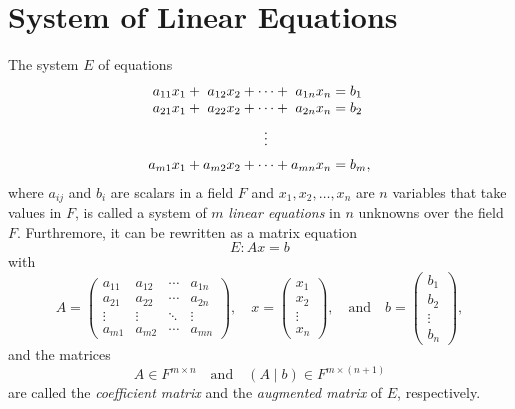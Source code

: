 \section{System of Linear Equations}
\begin{definition}
  \label{def:system-linear-equations}
  The system $E$ of equations
  \begin{equation*}
    \setlength\arraycolsep{0pt}
    \begin{array}{rcrcccrcl}
      a_{11}x_1 &\pl& a_{12}x_2 &\pl& \cdots &\pl& a_{1n}x_n &\eq& b_1 \\
      a_{21}x_1 &\pl& a_{22}x_2 &\pl& \cdots &\pl& a_{2n}x_n &\eq& b_2 \\[.5em]
                &   &           &   & \vdots &   &           &   &     \\[.5em]
      a_{m1}x_1 &\pl& a_{m2}x_2 &\pl& \cdots &\pl& a_{mn}x_n &\eq& b_m,
    \end{array}
  \end{equation*}
  where $a_{ij}$ and $b_i$ are scalars in a field $F$ and
  $x_1, x_2, \dots, x_n$ are $n$ variables that take values in $F$,
  is called a system of $m$ \emph{linear equations} in $n$ unknowns
  over the field $F$.
  Furthremore, it can be rewritten as a matrix equation
  \begin{equation*}
    E: Ax = b
  \end{equation*}
  with
  \begin{equation*}
    A =
    \begin{pmatrix}
      a_{11} & a_{12} & \cdots & a_{1n} \\
      a_{21} & a_{22} & \cdots & a_{2n} \\
      \vdots & \vdots & \ddots & \vdots \\
      a_{m1} & a_{m2} & \cdots & a_{mn}
    \end{pmatrix},
    \quad
    x = \begin{pmatrix} x_1 \\ x_2 \\ \vdots \\ x_n \end{pmatrix},
    \quad \text{and} \quad
    b = \begin{pmatrix} b_1 \\ b_2 \\ \vdots \\ b_n \end{pmatrix},
  \end{equation*}
  and the matrices
  \begin{equation*}
    A \in F^{m \times n}
    \quad \text{and} \quad
    (A \mid b) \in F^{m \times (n+1)}
  \end{equation*}
  are called the \emph{coefficient matrix} and the \emph{augmented matrix} of
  $E$, respectively.
\end{definition}

